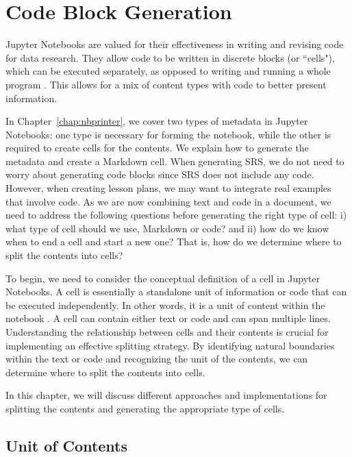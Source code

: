\chapter{Code Block Generation}
Jupyter Notebooks are valued for their effectiveness in writing and revising 
code for data research. They allow code to be written in discrete blocks (or 
``cells"), which can be executed separately, as opposed to writing and running 
a whole program \cite{jupyterNotebookUsage}. This allows for a mix of content 
types with code to better present information. 

In Chapter~\ref{chap:nbprinter}, we cover two types of metadata in Jupyter 
Notebooks: one type is necessary for forming the notebook, while the other is 
required to create cells for the contents. We explain how to generate the 
metadata and create a Markdown cell. When generating SRS, we do not need to 
worry about generating code blocks since SRS does not include any code. 
However, when creating lesson plans, we may want to integrate real examples 
that involve code. As we are now combining text and code in a document, we need 
to address the following questions before generating the right type of cell: i) 
what type of cell should we use, Markdown or code? and ii) how do we know when 
to end a cell and start a new one? That is, how do we determine where to split 
the contents into cells?
 
To begin, we need to consider the conceptual definition of a cell in Jupyter 
Notebooks. A cell is essentially a standalone unit of information or code that 
can be executed independently. In other words, it is a unit of content within 
the notebook \cite{cellsseparation}. A cell can contain either text or code and 
can span multiple lines. Understanding the relationship between cells and their 
contents is crucial for implementing an effective splitting strategy. By 
identifying natural boundaries within the text or code and recognizing the unit 
of the contents, we can determine where to split the contents into cells.

In this chapter, we will discuss different approaches and implementations for 
splitting the contents and generating the appropriate type of cells.

\section{Unit of Contents}

